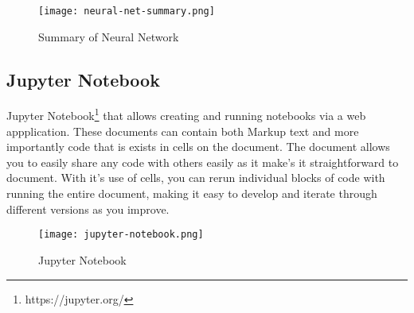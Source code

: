 \begin{figure}[ht]
    \centering
    \texttt{[image: neural-net-summary.png]}
    \caption{Summary of Neural Network}
    \label{fig:neuralNetworkSummary}
\end{figure}

\subsection{Jupyter Notebook} \label{jupyterNotebook}
Jupyter Notebook\footnote{https://jupyter.org/} that allows creating and running notebooks via a web appplication. These documents can contain both Markup text and more importantly code that is exists in cells on the document. The document allows you to easily share any code with others easily as it make's it straightforward to document. With it's use of cells, you can rerun individual blocks of code with running the entire document, making it easy to develop and iterate through different versions as you improve.
\begin{figure}[ht]
    \centering
    \texttt{[image: jupyter-notebook.png]}
    \caption{Jupyter Notebook}
    \label{fig:JupyterNotebook}
\end{figure}

